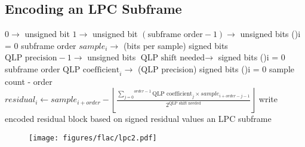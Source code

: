 \subsection{Encoding an LPC Subframe}
$0 \rightarrow$  unsigned bit
$1 \rightarrow$  unsigned bit
$(\text{subframe order} - 1) \rightarrow$  unsigned bits\;
\For(){i = 0 \emph{\KwTo}subframe order}{
  $sample_i \rightarrow$ \WRITE (bits per sample) signed bits\;
}
$\text{QLP precision} - 1 \rightarrow$  unsigned bits\;
$\text{QLP shift needed} \rightarrow$  signed bits\;
\For(){i = 0 \emph{\KwTo}subframe order}{
  $\text{QLP coefficient}_i \rightarrow$ \WRITE (QLP precision) signed bits\;
}
\BlankLine
\For(){i = 0 \emph{\KwTo}sample count - order}{
  $residual_i \leftarrow sample_{i + order} - \left \lfloor \frac{\overset{order - 1}{\underset{j = 0}{\sum}} \text{QLP coefficient}_j \times sample_{i + order - j - 1} }{2 ^ \text{QLP shift needed}} \right \rfloor$
}
write encoded residual block based on signed residual values\;
\Return an LPC subframe\;
\EALGORITHM
\begin{figure}[h]
\texttt{[image: figures/flac/lpc2.pdf]}
\end{figure}

\clearpage

